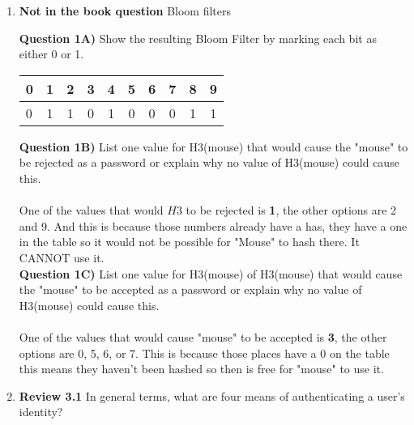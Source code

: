 \documentclass[12pt]{article}
\begin{document}
\renewcommand{\headrulewidth}{0.4pt}

\vspace{-3mm}

\begin{enumerate}

	\item {\textbf{Not in the book question} Bloom filters}
	
	\textbf{Question 1A) }Show the resulting Bloom Filter by marking each bit as either 0 or 1.
	
	\begin{center}
  \begin{tabular}{ l | c | c|c|c|c|c|c|c|c  }
    \hline
    0&1 & 2 & 3&4&5&6&7&8&9 \\ \hline
    0&1&1&0&1&0&0&0&1&1 \\ 
    \hline
  \end{tabular}
\end{center}

\textbf{Question 1B) } List one value for H3(mouse) that would cause the "mouse" to be rejected as a password or explain why no value of H3(mouse) could cause this.\\\\
One of the values that would  $H3$ to be rejected is \textbf{1}, the other options are 2 and 9. And this is because those numbers already have a has, they have a one in the table so it would not be possible for "Mouse" to hash there. It CANNOT use it. \\

\textbf{Question 1C)}  List one value for H3(mouse) of H3(mouse) that would cause the "mouse" to be accepted as a password or explain why no value of H3(mouse) could cause this.\\\\
One of the values that would cause "mouse" to be accepted is \textbf{3}, the other options are 0, 5, 6, or 7. This is because those places have a $0$ on the table this means they haven't been hashed so then is free for "mouse" to use it. \\

	\vspace{10pt}
	
	\item {\textbf{Review 3.1} In general terms, what are four means of authenticating a user's identity?} 
	

\end{enumerate}
\end{document}
